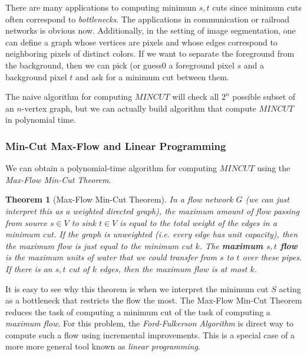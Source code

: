\documentclass[a4paper, 12pt]{report}
\newtheorem{theorem}{Theorem}[section]
\theoremstyle{remark}
\theoremstyle{definition}
\begin{document}
There are many applications to computing minimum $s, t$ cuts since minimum cuts often correspond to \textit{bottlenecks}. The applications in communication or railroad networks is obvious now. Additionally, in the setting of image segmentation, one can define a graph whose vertices are pixels and whose edges correspond to neighboring pixels of distinct colors. If we want to separate the foreground from the background, then we can pick (or guess0 a foreground pixel $s$ and a background pixel $t$ and ask for a minimum cut between them. 

The naive algorithm for computing $MINCUT$ will check all $2^n$ possible subset of an $n$-vertex graph, but we can actually build algorithm that compute $MINCUT$ in polynomial time. 

\subsubsection{Min-Cut Max-Flow and Linear Programming}
We can obtain a polynomial-time algorithm for computing $MINCUT$ using the \textit{Max-Flow Min-Cut Theorem}. 

\begin{theorem}[Max-Flow Min-Cut Theorem]
In a \textit{flow network} $G$ (we can just interpret this as a weighted directed graph), the maximum amount of flow passing from source $s \in V$ to sink $t \in V$ is equal to the total weight of the edges in a minimum cut. If the graph is unweighted (i.e. every edge has unit capacity), then the maximum flow is just equal to the minimum cut $k$. The \textbf{maximum $s, t$ flow} is the maximum units of water that we could transfer from $s$ to $t$ over these pipes. If there is an $s, t$ cut of $k$ edges, then the maximum flow is at most $k$. 
\end{theorem}

It is easy to see why this theorem is when we interpret the minimum cut $S$ acting as a bottleneck that restricts the flow the most. The Max-Flow Min-Cut Theorem reduces the task of computing a minimum cut of the task of computing a \textit{maximum flow}. For this problem, the \textit{Ford-Fulkerson Algorithm} is direct way to compute such a flow using incremental improvements. This is a special case of a more more general tool known as \textit{linear programming}. 
\end{document}
